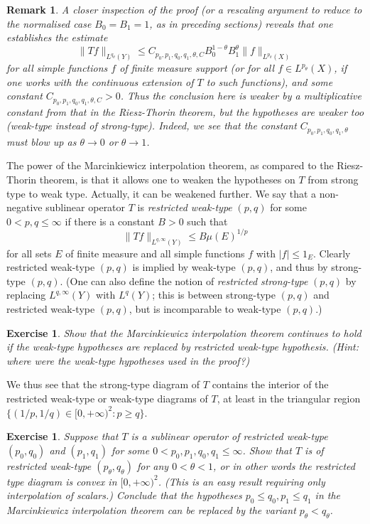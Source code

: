 \documentclass[10pt,reqno]{amsart}
\newtheorem{exercise}[theorem]{Exercise}
\newtheorem{remark}[theorem]{Remark}
\begin{document}
\begin{remark}
    A closer inspection of the proof (or a rescaling argument to reduce to the normalised case $B_0=B_1=1$, as in preceding sections) reveals that one establishes the estimate
    \[     \|Tf\|_{L^{q_\theta}(Y)} \leq C_{p_0,p_1,q_0,q_1,\theta,C} B_0^{1-\theta} B_1^\theta \|f\|_{L^{p_\theta}(X)}\]
    for all simple functions $f$ of finite measure support (or for all $f \in L^{p_\theta}(X)$, if one works with the continuous extension of $T$ to such functions), and some constant $C_{p_0,p_1,q_0,q_1,\theta,C} > 0$. Thus the conclusion here is weaker by a multiplicative constant from that in the Riesz-Thorin theorem, but the hypotheses are weaker too (weak-type instead of strong-type). Indeed, we see that the constant $C_{p_0,p_1,q_0,q_1,\theta}$ must blow up as $\theta \rightarrow 0$ or $\theta \rightarrow 1$. 
\end{remark}

The power of the Marcinkiewicz interpolation theorem, as compared to the Riesz-Thorin theorem, is that it allows one to weaken the hypotheses on $T$ from strong type to weak type. Actually, it can be weakened further. We say that a non-negative sublinear operator $T$ is \emph{restricted weak-type} $(p,q)$ for some $0 < p,q \leq \infty$ if there is a constant $B > 0$ such that
%
\[ \| Tf \|_{L^{q,\infty}(Y)} \leq B \mu(E)^{1/p}\]
%
for all sets $E$ of finite measure and all simple functions $f$ with $|f| \leq 1_E$. Clearly restricted weak-type $(p,q)$ is implied by weak-type $(p,q)$, and thus by strong-type $(p,q)$. (One can also define the notion of \emph{restricted strong-type} $(p,q)$ by replacing $L^{q,\infty}(Y)$ with $L^q(Y)$; this is between strong-type $(p,q)$ and restricted weak-type $(p,q)$, but is incomparable to weak-type $(p,q)$.)

\begin{exercise}
    Show that the Marcinkiewicz interpolation theorem continues to hold if the weak-type hypotheses are replaced by restricted weak-type hypothesis. (Hint: where were the weak-type hypotheses used in the proof?) 
\end{exercise}

We thus see that the strong-type diagram of $T$ contains the interior of the restricted weak-type or weak-type diagrams of $T$, at least in the triangular region $\{ (1/p,1/q) \in [0,+\infty)^2: p \geq q \}$.

\begin{exercise}
    Suppose that $T$ is a sublinear operator of restricted weak-type $(p_0,q_0)$ and $(p_1,q_1)$ for some $0 < p_0,p_1,q_0,q_1 \leq \infty$. Show that $T$ is of restricted weak-type $(p_\theta,q_\theta)$ for any $0 < \theta < 1$, or in other words the restricted type diagram is convex in $[0,+\infty)^2$. (This is an easy result requiring only interpolation of scalars.) Conclude that the hypotheses $p_0 \leq q_0, p_1 \leq q_1$ in the Marcinkiewicz interpolation theorem can be replaced by the variant $p_\theta < q_\theta$. 
\end{exercise}
\end{document}
